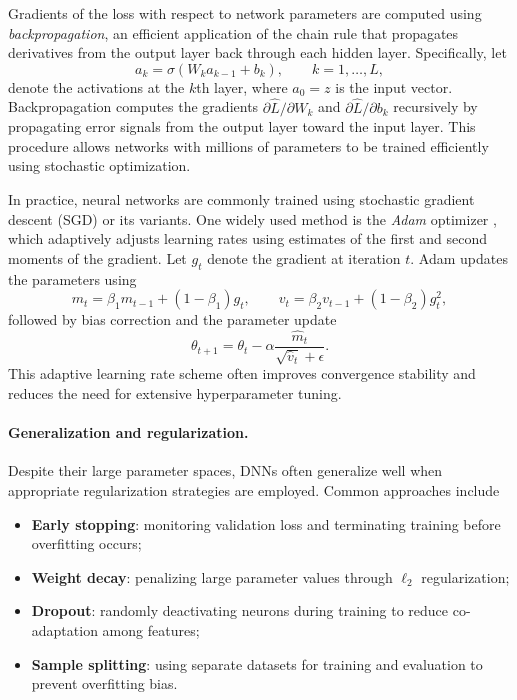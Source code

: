 \documentclass[12pt,reqno,oneside]{amsbook}
\theoremstyle{definition}
\theoremstyle{remark}
\begin{document}
Gradients of the loss with respect to network parameters are computed using
\emph{backpropagation}, an efficient application of the chain rule that
propagates derivatives from the output layer back through each hidden layer.
Specifically, let
\[
a_k = \sigma(W_k a_{k-1}+b_k),
\qquad k=1,\ldots,L,
\]
denote the activations at the $k$th layer, where $a_0=z$ is the input vector.
Backpropagation computes the gradients
$\partial \hat L/\partial W_k$ and
$\partial \hat L/\partial b_k$
recursively by propagating error signals from the output layer toward the input
layer. This procedure allows networks with millions of parameters to be trained
efficiently using stochastic optimization.



In practice, neural networks are commonly trained using stochastic gradient
descent (SGD) or its variants. One widely used method is the \emph{Adam}
optimizer \cite{Kingma2015}, which adaptively adjusts learning rates using
estimates of the first and second moments of the gradient. Let $g_t$ denote
the gradient at iteration $t$. Adam updates the parameters using
\[
m_t = \beta_1 m_{t-1} + (1-\beta_1) g_t, \qquad
v_t = \beta_2 v_{t-1} + (1-\beta_2) g_t^2,
\]
followed by bias correction and the parameter update
\[
\theta_{t+1}
=
\theta_t
-
\alpha
\frac{\hat m_t}{\sqrt{\hat v_t}+\epsilon}.
\]
This adaptive learning rate scheme often improves convergence stability and
reduces the need for extensive hyperparameter tuning.

\paragraph{Generalization and regularization.}
Despite their large parameter spaces, DNNs often generalize well when
appropriate regularization strategies are employed. Common approaches include

\begin{itemize}
\item \textbf{Early stopping}: monitoring validation loss and terminating
training before overfitting occurs;
\item \textbf{Weight decay}: penalizing large parameter values through
$\ell_2$ regularization;
\item \textbf{Dropout}: randomly deactivating neurons during training to
reduce co-adaptation among features;
\item \textbf{Sample splitting}: using separate datasets for training and
evaluation to prevent overfitting bias.
\end{itemize}
\end{document}
